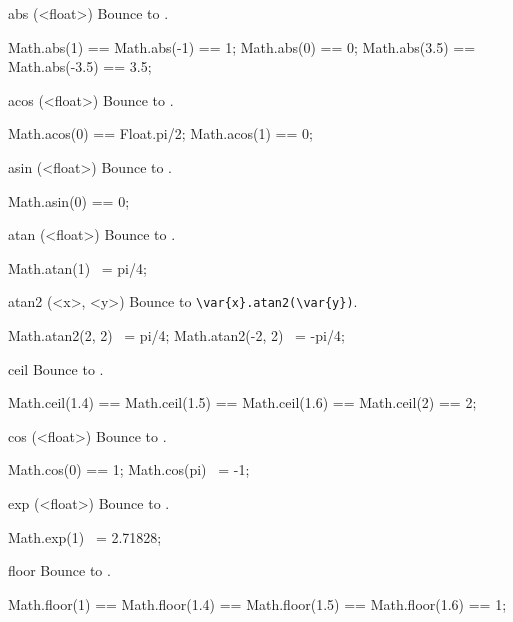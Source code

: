 \begin{urbiscriptapi}
\item[abs](<float>)%
  Bounce to .
\begin{urbiassert}
Math.abs(1) == Math.abs(-1) == 1;
Math.abs(0) == 0;
Math.abs(3.5) == Math.abs(-3.5) == 3.5;
\end{urbiassert}


\item[acos](<float>)%
  Bounce to .
\begin{urbiassert}
Math.acos(0) == Float.pi/2;
Math.acos(1) == 0;
\end{urbiassert}


\item[asin](<float>)%
  Bounce to .
\begin{urbiassert}
Math.asin(0) == 0;
\end{urbiassert}


\item[atan](<float>)%
  Bounce to .
\begin{urbiassert}
Math.atan(1) ~= pi/4;
\end{urbiassert}


\item[atan2](<x>, <y>)%
  Bounce to \lstinline|\var{x}.atan2(\var{y})|.
\begin{urbiassert}
Math.atan2(2, 2) ~= pi/4;
Math.atan2(-2, 2) ~= -pi/4;
\end{urbiassert}


\item[ceil] Bounce to .
\begin{urbiassert}
Math.ceil(1.4) == Math.ceil(1.5) ==  Math.ceil(1.6) == Math.ceil(2) == 2;
\end{urbiassert}


\item[cos](<float>)%
  Bounce to .
\begin{urbiassert}
Math.cos(0) == 1;
Math.cos(pi) ~= -1;
\end{urbiassert}


\item[exp](<float>)%
  Bounce to .
\begin{urbiassert}
Math.exp(1) ~= 2.71828;
\end{urbiassert}


\item[floor] Bounce to .
\begin{urbiassert}
Math.floor(1) == Math.floor(1.4) == Math.floor(1.5) ==  Math.floor(1.6) == 1;
\end{urbiassert}



\end{urbiscriptapi}
